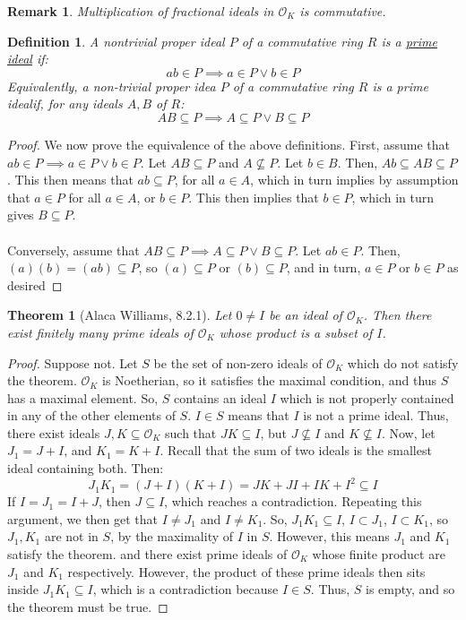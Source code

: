 \documentclass{article}
\newcommand{\air}{\mathcal{O}_K}
\newtheorem{theorem}{Theorem}[subsection]
\newtheorem{remark}{Remark}[subsection]
\newtheorem{definition}{Definition}[subsection]
\begin{document}
\begin{remark}
Multiplication of fractional ideals in $\air$ is commutative.
\end{remark}
\begin{definition}
A nontrivial proper ideal $P$ of a commutative ring $R$ is a \underline{prime ideal} if: $$ab\in P\implies a\in P\vee b\in P$$
Equivalently, a non-trivial proper idea $P$ of a commutative ring $R$ is a prime idealif, for any ideals $A,B$ of $R$:
$$AB\subseteq P\implies A\subseteq P\vee B\subseteq P$$
\end{definition}
\begin{proof}
We now prove the equivalence of the above definitions. First, assume that $ab\in P\implies a\in P\vee b\in P$. Let $AB\subseteq P$ and $A\not\subseteq P$. Let $b\in B$. Then, $Ab\subseteq AB\subseteq P$. This then means that $ab\subseteq P$, for all $a\in A$, which in turn implies by assumption that $a\in P$ for all $a\in A$, or $b\in P$. This then implies that $b\in P$, which in turn gives $B\subseteq P$.\\
\\
Conversely, assume that $AB\subseteq P\implies A\subseteq P\vee B\subseteq P$. Let $ab\in P$. Then, $(a)(b)=(ab)\subseteq P$, so $(a)\subseteq P$ or $(b)\subseteq P$, and in turn, $a\in P$ or $b\in P$ as desired
\end{proof}
\newpage
\begin{theorem}[Alaca Williams, 8.2.1]
Let $0\neq I$ be an ideal of $\air$. Then there exist finitely many prime ideals of $\air$ whose product is a subset of $I$. 
\end{theorem}
\begin{proof}
Suppose not. Let $S$ be the set of non-zero ideals of $\air$ which do not satisfy the theorem. $\air$ is Noetherian, so it satisfies the maximal condition, and thus $S$ has a maximal element. So, $S$ contains an ideal $I$ which is not properly contained in any of the other elements of $S$. $I\in S$ means that $I$ is not a prime ideal. Thus, there exist ideals $J,K\subseteq \air$ such that $JK\subseteq I$, but $J\not\subseteq I$ and $K\not\subseteq I$. Now, let $J_1 = J+I$, and $K_1=K+I$. Recall that the sum of two ideals is the smallest ideal containing both. Then:
$$J_1K_1 = (J+I)(K+I)=JK + JI + IK + I^2\subseteq I$$
If $I=J_1=I+J$, then $J\subseteq I$, which reaches a contradiction. Repeating this argument, we then get that $I\neq J_1$ and $I\neq K_1$. So, $J_1K_1\subseteq I$, $I\subset J_1$, $I\subset K_1$, so $J_1, K_1$ are not in $S$, by the maximality of $I$ in $S$. However, this means $J_1$ and $K_1$ satisfy the theorem. and there exist prime ideals of $\air$ whose finite product are $J_1$ and $K_1$ respectively. However, the product of these prime ideals then sits inside $J_1K_1\subseteq I$, which is a contradiction because $I\in S$. Thus, $S$ is empty, and so the theorem must be true.
\end{proof}
\end{document}
